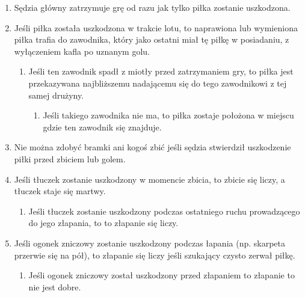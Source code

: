 \documentclass[11pt,a4paper]{article}
\renewcommand{\subsection}[1]{
  \oldsubsection{#1}%
  \label{\thesubsection}
}
\begin{document}
\begin{enumerate}

\item
  Sędzia główny zatrzymuje grę od razu jak tylko piłka zostanie
  uszkodzona.
\item
  Jeśli piłka została uszkodzona w trakcie lotu, to naprawiona lub
  wymieniona piłka trafia do zawodnika, który jako ostatni miał tę piłkę
  w posiadaniu, z wyłączeniem kafla po uznanym golu.

  \begin{enumerate}
  
  \item
    Jeśli ten zawodnik spadł z miotły przed zatrzymaniem gry, to piłka
    jest przekazywana najbliższemu nadającemu się do tego zawodnikowi z
    tej samej drużyny.

    \begin{enumerate}
    
    \item
      Jeśli takiego zawodnika nie ma, to piłka zostaje położona w
      miejscu gdzie ten zawodnik się znajduje.
    \end{enumerate}
  \end{enumerate}
\item
  Nie można zdobyć bramki ani kogoś zbić jeśli sędzia stwierdził
  uszkodzenie piłki przed zbiciem lub golem.
\item
  Jeśli tłuczek zostanie uszkodzony w momencie zbicia, to zbicie się
  liczy, a tłuczek staje się martwy.

  \begin{enumerate}
  
  \item
    Jeśli tłuczek zostanie uszkodzony podczas ostatniego ruchu
    prowadzącego do jego złapania, to to złapanie się liczy.
  \end{enumerate}
\item
  Jeśli ogonek zniczowy zostanie uszkodzony podczas łapania (np.
  skarpeta przerwie się na pół), to złapanie się liczy jeśli szukający
  czysto zerwał piłkę.

  \begin{enumerate}
  
  \item
    Jeśli ogonek zniczowy został uszkodzony przed złapaniem to złapanie
    to nie jest dobre.
  \end{enumerate}
\end{enumerate}

\subsection{Miotły}
\end{document}
